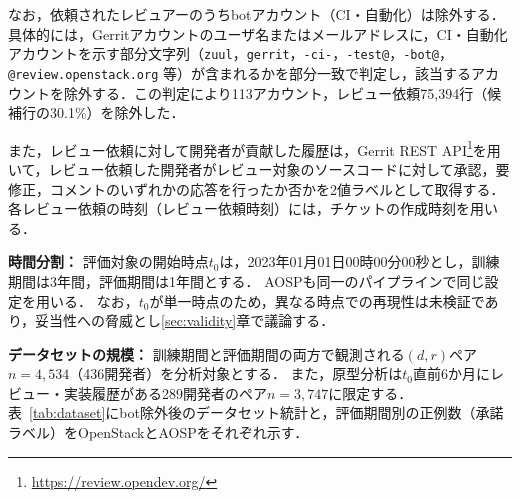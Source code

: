 \documentclass[submit,noauthor,ses,dvipdfmx]{ipsj}
\newcommand{\todo}[1]{\colorbox{yellow}{{\bf TODO}:}{\color{red} {\textbf{[#1]}}}}
\begin{document}
なお，依頼されたレビュアーのうちbotアカウント（CI・自動化）は除外する．具体的には，Gerritアカウントのユーザ名またはメールアドレスに，CI・自動化アカウントを示す部分文字列（\texttt{zuul}，\texttt{gerrit}，\texttt{-ci-}，\texttt{-test@}，\texttt{-bot@}，\texttt{@review.openstack.org} 等）が含まれるかを部分一致で判定し，該当するアカウントを除外する．この判定により113アカウント，レビュー依頼75,394行（候補行の30.1\%）を除外した．

また，レビュー依頼に対して開発者が貢献した履歴は，Gerrit REST API\footnote{\url{https://review.opendev.org/}}を用いて，レビュー依頼した開発者がレビュー対象のソースコードに対して承認，要修正，コメントのいずれかの応答を行ったか否かを2値ラベルとして取得する．各レビュー依頼の時刻（レビュー依頼時刻）には，チケットの作成時刻を用いる．

\noindent\textbf{時間分割：}
評価対象の開始時点$t_0$は，2023年01月01日00時00分00秒とし，訓練期間は3年間，評価期間は1年間とする． AOSPも同一のパイプラインで同じ設定を用いる． なお，$t_0$が単一時点のため，異なる時点での再現性は未検証であり，妥当性への脅威とし\ref{sec:validity}章で議論する．

\noindent\textbf{データセットの規模：}
訓練期間と評価期間の両方で観測される$(d, r)$ペア$n = 4,534$（436開発者）を分析対象とする．
また，原型分析は$t_0$直前6か月にレビュー・実装履歴がある289開発者のペア$n = 3,747$に限定する．
 表~\ref{tab:dataset}にbot除外後のデータセット統計と，評価期間別の正例数（承諾ラベル）をOpenStackとAOSPをそれぞれ示す．
\end{document}
